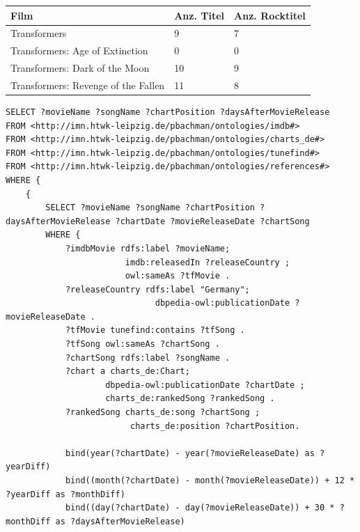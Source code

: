 \documentclass[parskip]{scrartcl}
\begin{document}
\pagebreak
{}
\label{tab:resultLastFm}
\begin{tabular}{p{}|C{0.18\textwidth}|C{0.25\textwidth}}
    \textbf{Film} & \textbf{Anz. Titel} & \textbf{Anz. Rocktitel} \\ \hline
    Transformers & 9 & 7 \\
    Transformers: Age of Extinction & 0 & 0 \\
    Transformers: Dark of the Moon & 10 & 9 \\
    Transformers: Revenge of the Fallen & 11 & 8\\
\end{tabular}

\begin{lstlisting}[caption={SPARQL-Anfrage zur Beantwortung der Recherchefragestellung}, label={lst:questionSparql}]
SELECT ?movieName ?songName ?chartPosition ?daysAfterMovieRelease
FROM <http://imn.htwk-leipzig.de/pbachman/ontologies/imdb#>
FROM <http://imn.htwk-leipzig.de/pbachman/ontologies/charts_de#>
FROM <http://imn.htwk-leipzig.de/pbachman/ontologies/tunefind#>
FROM <http://imn.htwk-leipzig.de/pbachman/ontologies/references#>
WHERE { 
    {
        SELECT ?movieName ?songName ?chartPosition ?daysAfterMovieRelease ?chartDate ?movieReleaseDate ?chartSong
        WHERE {
            ?imdbMovie rdfs:label ?movieName;
                        imdb:releasedIn ?releaseCountry ;
                        owl:sameAs ?tfMovie .
            ?releaseCountry rdfs:label "Germany";
                              dbpedia-owl:publicationDate ?movieReleaseDate .
            ?tfMovie tunefind:contains ?tfSong .
            ?tfSong owl:sameAs ?chartSong .
            ?chartSong rdfs:label ?songName .
            ?chart a charts_de:Chart;
                    dbpedia-owl:publicationDate ?chartDate ;
                    charts_de:rankedSong ?rankedSong .
            ?rankedSong charts_de:song ?chartSong ;
                         charts_de:position ?chartPosition.
            
            bind(year(?chartDate) - year(?movieReleaseDate) as ?yearDiff)
            bind((month(?chartDate) - month(?movieReleaseDate)) + 12 * ?yearDiff as ?monthDiff)
            bind((day(?chartDate) - day(?movieReleaseDate)) + 30 * ?monthDiff as ?daysAfterMovieRelease)
            

\end{lstlisting}
\end{document}
